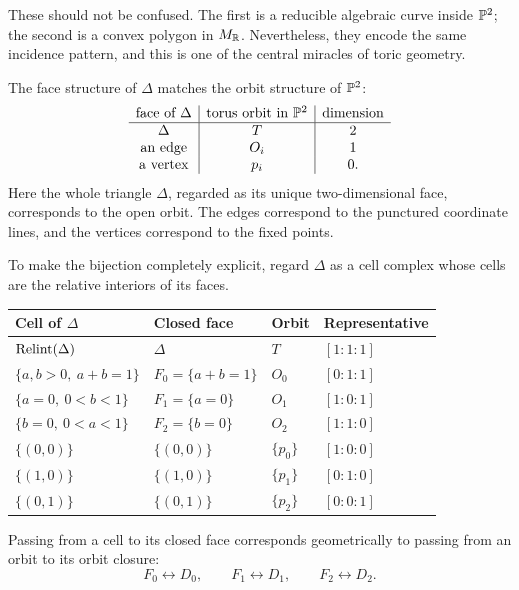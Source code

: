 These should not be confused. The first is a reducible algebraic curve
inside \(\mathbb{P}^2\); the second is a convex polygon in \(M_{\mathbb{R}}\).
Nevertheless, they encode the same incidence pattern, and this is one
of the central miracles of toric geometry.

The face structure of \(\Delta\) matches the orbit structure of
\(\mathbb{P}^2\):
\[
\begin{array}{c|c|c}
\text{face of }\Delta
&
\text{torus orbit in }\mathbb{P}^2
&
\text{dimension}
\\
\hline
\Delta
&
T
&
2
\\
\text{an edge}
&
O_i
&
1
\\
\text{a vertex}
&
p_i
&
0.
\end{array}
\]
Here the whole triangle \(\Delta\), regarded as its unique
two-dimensional face, corresponds to the open orbit. The edges
correspond to the punctured coordinate lines, and the vertices
correspond to the fixed points.

To make the bijection completely explicit, regard \(\Delta\) as a
cell complex whose cells are the relative interiors of its faces.

\begin{center}
\small
\begin{tabularx}{\linewidth}{@{}
  >{\raggedright\arraybackslash}X
  >{\raggedright\arraybackslash}X
  >{\raggedright\arraybackslash}X
  >{\raggedright\arraybackslash}X@{}}
\toprule
\textbf{Cell of \(\Delta\)}
&
\textbf{Closed face}
&
\textbf{Orbit}
&
\textbf{Representative}
\\
\midrule
\(\operatorname{Relint}(\Delta)\)
&
\(\Delta\)
&
\(T\)
&
\([1:1:1]\)
\\[1mm]
\(\{a,b>0,\ a+b=1\}\)
&
\(F_0=\{a+b=1\}\)
&
\(O_0\)
&
\([0:1:1]\)
\\[1mm]
\(\{a=0,\ 0<b<1\}\)
&
\(F_1=\{a=0\}\)
&
\(O_1\)
&
\([1:0:1]\)
\\[1mm]
\(\{b=0,\ 0<a<1\}\)
&
\(F_2=\{b=0\}\)
&
\(O_2\)
&
\([1:1:0]\)
\\[1mm]
\(\{(0,0)\}\)
&
\(\{(0,0)\}\)
&
\(\{p_0\}\)
&
\([1:0:0]\)
\\[1mm]
\(\{(1,0)\}\)
&
\(\{(1,0)\}\)
&
\(\{p_1\}\)
&
\([0:1:0]\)
\\[1mm]
\(\{(0,1)\}\)
&
\(\{(0,1)\}\)
&
\(\{p_2\}\)
&
\([0:0:1]\)
\\
\bottomrule
\end{tabularx}
\end{center}

Passing from a cell to its closed face corresponds geometrically to
passing from an orbit to its orbit closure:
\[
F_0\longleftrightarrow D_0,\qquad
F_1\longleftrightarrow D_1,\qquad
F_2\longleftrightarrow D_2.
\]

